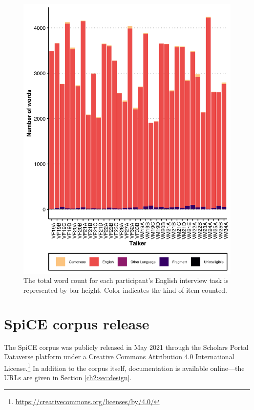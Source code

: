 \begin{figure}[!htbp]
  \begin{center}
  \includegraphics[width=4.9in]{figures/ch2_englishtypecounts_5in.png} 
  \caption{The total word count for each participant's English interview task is represented by bar height. Color indicates the kind of item counted. }
  \label{ch2:fig:englishtypecounts}
  \end{center}
\end{figure}

\section{SpiCE corpus release}\label{ch2:sec:releases}

The SpiCE corpus was publicly released in May 2021 through the Scholars Portal Dataverse platform under a Creative Commons Attribution 4.0 International License.\footnote{\url{https://creativecommons.org/licenses/by/4.0/}} In addition to the corpus itself, documentation is available online---the URLs are given in Section \ref{ch2:sec:design}.

